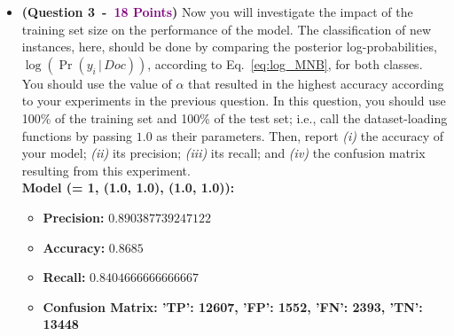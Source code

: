 \documentclass{article}
\newcommand{\POINTS}[1]{\textcolor{purple}{\textbf{{#1}}}}
\begin{document}
\begin{itemize}
\textbf{Analyze:}
\begin{itemize}
    \item When $\alpha = 1$, accuracy reaches its maximum value because moderate smoothing effectively mitigates the impact of rare/unseen words without compromising normal linguistic classification distinctions.
    \item When $\alpha$ is too small, encountering a few words that are rare in a certain class can make the model overly sensitive to random variations in the samples. The model becomes “overly trusting” of those rare words, leading to overfitting.
    \item When $\alpha$ is too large, all words carry roughly equal importance, and the probabilities of all words approach a uniform distribution. This causes the model to underfit.
\end{itemize}





\vspace{0.4cm}
 \item \textbf{(Question 3~-~\POINTS{18 Points})} Now you will investigate the impact of the training set size on the performance of the model. The classification of new instances, here, should be done by comparing the posterior log-probabilities, $\log(\Pr(y_i \, | \, Doc))$, according to Eq.~\eqref{eq:log_MNB}, for both classes. You should use the value of $\alpha$ that resulted in the highest accuracy according to your experiments in the previous question. In this question, you should use 100\% of the training set and 100\% of the test set; i.e., call the dataset-loading functions by passing $1.0$ as their parameters. Then, report \textit{(i)} the accuracy of your model; \textit{(ii)} its precision; \textit{(iii)} its recall; and \textit{(iv)} the confusion matrix resulting from this experiment.
\\

\noindent \textbf{Model (\alpha = 1, (1.0, 1.0), (1.0, 1.0)):}

\begin{itemize}
    \item \textbf{Precision: }$0.890387739247122$
    \item \textbf{Accuracy: }$0.8685$ 
    \item \textbf{Recall: }$0.8404666666666667$
    \item \textbf{Confusion Matrix: 'TP': 12607, 'FP': 1552, 'FN': 2393, 'TN': 13448}
\end{itemize}








\end{itemize}
\end{document}
